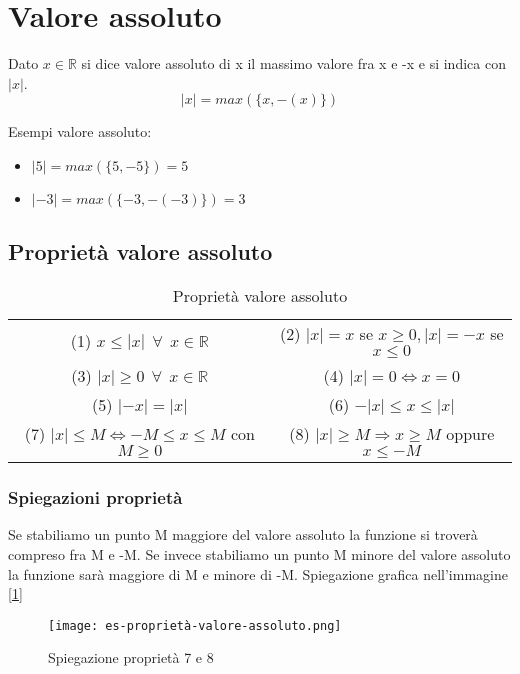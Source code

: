 \newpage
\section{Valore assoluto}
\begin{definition}
    Dato $x \in \mathbb{R}$ si dice valore assoluto di x il massimo valore fra x e -x e si indica con $|x|$.
    \begin{equation}
        |x| = max(\{x, -(x)\})
    \end{equation}
\end{definition}
\begin{example}
    Esempi valore assoluto:
    \begin{itemize}
        \item $|5| = max(\{5, -5\}) = 5$
        \item $|-3| = max(\{-3, -(-3)\}) = 3$
    \end{itemize}
\end{example}
\subsection{Proprietà valore assoluto}
\begin{table}[h!]
    \setlength{\tabcolsep}{7pt}
    \renewcommand{\arraystretch}{2}
    \centering
    \begin{tabular}{|c|c|}
        \hline
        (1) $x \leq |x| \: \: \forall \: \: x \in \mathbb{R}$ & (2) $|x| = x$ se $x \geq 0, |x| = -x$ se $x \leq 0$ \\
        (3) $|x| \geq 0 \: \: \forall \: \: x \in \mathbb{R}$ & (4) $|x| = 0 \Longleftrightarrow x = 0$ \\
        (5) $|-x| = |x|$ & (6) $-|x| \leq x \leq |x|$ \\
        (7) $|x| \leq M \Longleftrightarrow -M \leq x \leq M$ con $M \geq 0$ & (8) $|x| \geq M \Longrightarrow x \geq M$ oppure $x \leq -M$ \\ \hline
    \end{tabular}
    \caption{Proprietà valore assoluto}
    \label{tab:prop-valore-assoluto}
\end{table}
\subsubsection{Spiegazioni proprietà}
Se stabiliamo un punto M maggiore del valore assoluto la funzione si troverà compreso fra M e -M. Se invece stabiliamo un punto M minore del valore assoluto la funzione sarà maggiore di M e minore di -M. Spiegazione grafica nell'immagine [\ref{fig:prop-6-7}]
\begin{figure}[h!]
    \centering
    \texttt{[image: es-proprietà-valore-assoluto.png]}
    \caption{Spiegazione proprietà 7 e 8}
    \label{fig:prop-6-7}
\end{figure}

